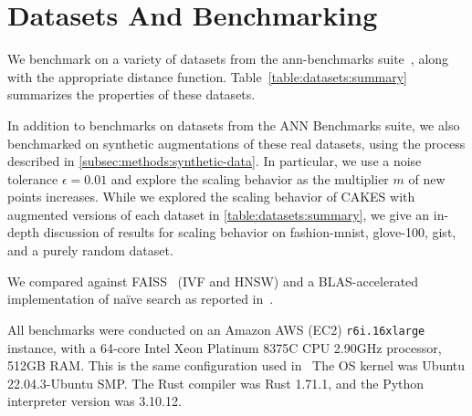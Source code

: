 
\section{Datasets And Benchmarking}
\label{sec:datasets-and-benchmarks}

We benchmark on a variety of datasets from the ann-benchmarks suite~\cite{Aumller2018ANNBenchmarksAB}, along with the appropriate distance function.
Table~\ref{table:datasets:summary} summarizes the properties of these datasets.

In addition to benchmarks on datasets from the ANN Benchmarks suite, we also benchmarked on synthetic augmentations of these real datasets, using the process described in \ref{subsec:methods:synthetic-data}. In particular, we use a noise tolerance $\epsilon = 0.01$ and explore the scaling behavior as the multiplier $m$ of new points increases. While we explored the scaling behavior of CAKES with augmented versions of each dataset in \ref{table:datasets:summary}, we give an in-depth discussion of results for scaling behavior on fashion-mnist, glove-100, gist, and a purely random dataset. 

We compared against FAISS~\cite{johnson2019billion} (IVF and HNSW) and a BLAS-accelerated implementation of na\"ive search as reported in~\cite{johnson2019billion}.

All benchmarks were conducted on an Amazon AWS (EC2) \texttt{r6i.16xlarge} instance, with a 64-core Intel Xeon Platinum 8375C CPU 2.90GHz processor, 512GB RAM.
This is the same configuration used in~\cite{Aumller2018ANNBenchmarksAB}
The OS kernel was Ubuntu 22.04.3-Ubuntu SMP. 
The Rust compiler was Rust 1.71.1, and the Python interpreter version was 3.10.12.

